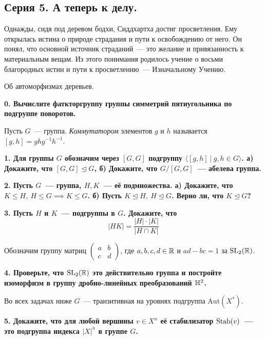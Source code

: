 \documentclass[12pt, oneside, dvipsnames]{extarticle}
\begin{document}
	\begin{center}
		\subsection*{Серия 5. А теперь к делу. }
	\end{center}

	\epigraph{Однажды, сидя под деревом бодхи, Сиддхартха достиг просветления. Ему открылась истина о природе страдания и пути к освобождению от него. Он понял, что основной источник страданий~--- это желание и привязанность к материальным вещам. Из этого понимания родилось учение о восьми благородных истин и пути к просветлению~--- Изначальному Учению.}{Об автоморфизмах деревьев.}

	\bf{0.}  Вычислите фаткторгруппу группы симметрий пятиугольника по подгруппе поворотов. 

	\begin{definition} 
		Пусть $G$~--- группа. \emph{Коммутатором} элементов $g$ и $h$ называется $[g, h] = g h g^{-1} h^{-1}$.
	\end{definition}

	\bf{1.} Для группы $G$ обозначим через $[G, G]$ подгруппу $\langle [g, h] \ \vert \ g, h \in G \rangle$. а) Докажите, что $[G, G] \trianglelefteq G$, б) Докажите, что $G/[G, G]$~--- абелева группа. 

	\bf{2.} Пусть $G$~--- группа, $H, K$~--- её подмножества. а) Докажите, что $K \le H, \ H \le G \implies K \le G$. б) Пусть $K \trianglelefteq  H, \ H \trianglelefteq  G$. Верно ли, что $K \trianglelefteq  G$?

	\bf{3.} Пусть $H$ и $K$~--- подгруппы в $G$. Докажите, что 
	\[
		|HK| = \frac{|H|\cdot|K|}{|H \cap K|}	
	\]
	\begin{definition} 
		Обозначим группу матриц $\begin{pmatrix} a & b \\ c & d \end{pmatrix}$, где $a, b, c, d \in \mathbb{R}$ и $ad - bc = 1$ за $\mathrm{SL}_{2}(\mathbb{R})$.
	\end{definition}

	\bf{4.} Проверьте, что $\mathrm{SL}_{2}(\mathbb{R})$ это действительно группа и постройте изоморфизм в группу дробно-линейных преобразований $\mathbb{H}^2$. 

	Во всех задачах ниже $G$~--- транзитивная на уровнях подгруппа $\mathrm{Aut}(X^*)$.

	\bf{5.}  Докажите, что для любой вершины $v \in X^n$ её стабилизатор  $\operatorname{Stab}(v)$~--- это подгруппа индекса $|X|^n$ в группе $G$. 
\end{document}
